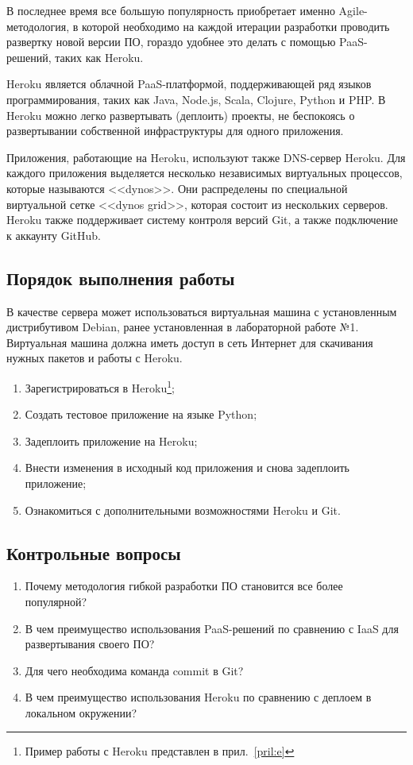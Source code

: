 В последнее время все большую популярность приобретает именно Agile-методология, в которой необходимо на каждой итерации разработки проводить развертку новой версии ПО, гораздо удобнее это делать с помощью PaaS-решений, таких как Heroku.

Heroku является облачной PaaS-платформой, поддерживающей ряд языков программирования, таких как Java, Node.js, Scala, Clojure, Python и PHP.
В Heroku можно легко развертывать (деплоить) проекты, не беспокоясь о развертывании собственной инфраструктуры для одного приложения.

Приложения, работающие на Heroku, используют также DNS-сервер Heroku.
Для каждого приложения выделяется несколько независимых виртуальных процессов, которые называются <<dynos>>.
Они распределены по специальной виртуальной сетке <<dynos grid>>, которая состоит из нескольких серверов.
Heroku также поддерживает систему контроля версий Git, а также подключение к аккаунту GitHub.

\subsection{Порядок выполнения работы}

В качестве сервера может использоваться виртуальная машина с установленным дистрибутивом Debian, ранее установленная в лабораторной работе №1.
Виртуальная машина должна иметь доступ в сеть Интернет для скачивания нужных пакетов и работы с Heroku.

\begin{enumerate}
    \item Зарегистрироваться в Heroku\footnote{Пример работы с Heroku представлен в прил.~\ref{pril:e}};
    \item Создать тестовое приложение на языке Python;
    \item Задеплоить приложение на Heroku;
    \item Внести изменения в исходный код приложения и снова задеплоить приложение;
    \item Ознакомиться с дополнительными возможностями Heroku и Git.
\end{enumerate}

\subsection{Контрольные вопросы}
\begin{enumerate}
    \item Почему методология гибкой разработки ПО становится все более популярной?
    \item В чем преимущество использования PaaS-решений по сравнению с IaaS для развертывания своего ПО?
    \item Для чего необходима команда commit в Git?
    \item В чем преимущество использования Heroku по сравнению с деплоем в локальном окружении?
\end{enumerate}

\clearpage
